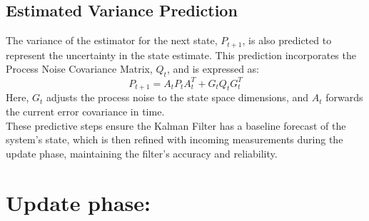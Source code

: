 \documentclass{article}
\begin{document}
\subsection{Estimated Variance Prediction}
The variance of the estimator for the next state, \( P_{t+1} \), is also predicted to represent the uncertainty in the state estimate. This prediction incorporates the Process Noise Covariance Matrix, \( Q_t \), and is expressed as:
\[
P_{t+1} = A_t P_t A_t^T + G_t Q_t G_t^T
\]
Here, \( G_t \) adjusts the process noise to the state space dimensions, and \( A_t \) forwards the current error covariance in time.
\\

\noindent
These predictive steps ensure the Kalman Filter has a baseline forecast of the system's state, which is then refined with incoming measurements during the update phase, maintaining the filter's accuracy and reliability.

\section{Update phase:}
\end{document}
